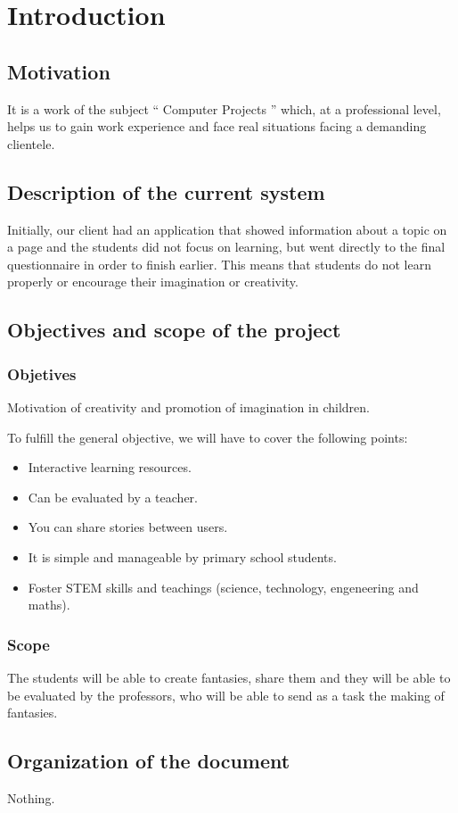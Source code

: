 \chapter{Introduction}
\section{Motivation}
It is a work of the subject `` Computer Projects '' which, at a professional level, helps us to gain work experience and face real situations facing a demanding clientele.

\section{Description of the current system}
Initially, our client had an application that showed information about a topic on a page and the students did not focus on learning, but went directly to the final questionnaire in order to finish earlier. This means that students do not learn properly or encourage their imagination or creativity.

\section{Objectives and scope of the project}
\subsection{Objetives}
Motivation of creativity and promotion of imagination in children.

To fulfill the general objective, we will have to cover the following points:
\begin{itemize}
	\item Interactive learning resources.
	\item Can be evaluated by a teacher.
	\item You can share stories between users.
	\item It is simple and manageable by primary school students.
	\item Foster STEM skills and teachings (science, technology, engeneering and maths).
\end{itemize}

\subsection{Scope}
The students will be able to create fantasies, share them and they will be able to be evaluated by the professors, who will be able to send as a task the making of fantasies.

\section{Organization of the document}
Nothing.
